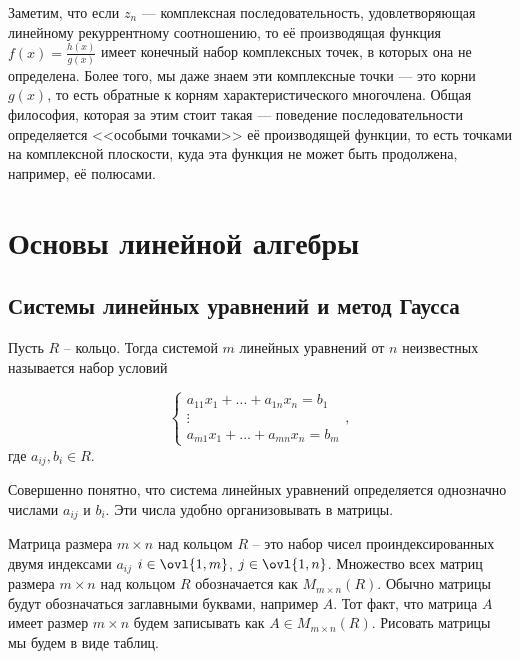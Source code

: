 Заметим, что если $z_n$ --- комплексная последовательность, удовлетворяющая линейному рекуррентному соотношению, то её производящая функция $f(x)=\frac{h(x)}{g(x)}$ имеет конечный набор комплексных точек, в которых она не определена. Более того, мы даже знаем эти комплексные точки --- это корни $g(x)$, то есть обратные к корням характеристического многочлена. Общая философия, которая за этим стоит такая --- поведение последовательности определяется  <<особыми точками>> её производящей функции, то есть точками на комплексной плоскости, куда эта  функция не может быть продолжена, например, её полюсами.




\chapter{Основы линейной алгебры}


\setcounter{zad}{0}
\setcounter{lem}{0}
\setcounter{thm}{0}
\setcounter{cor}{0}




\section{Системы линейных уравнений и метод Гаусса}

\dfn Пусть $R$ -- кольцо. Тогда системой $m$ линейных уравнений от $n$ неизвестных называется набор условий

$$\begin{cases}
a_{11}x_1+\dots + a_{1n}x_n=b_1\\
\vdots \\
a_{m1}x_1+\dots+a_{mn}x_n=b_m
\end{cases},$$
где $a_{ij}, b_i \in R$.
\edfn

Совершенно понятно, что система линейных уравнений определяется однозначно числами $a_{ij}$ и $b_i$. Эти числа удобно организовывать в матрицы.

\dfn Матрица размера $m\times n$ над кольцом $R$ -- это набор чисел проиндексированных двумя индексами $a_{ij}$ $i\in \ovl{1,m}$, $j\in \ovl{1,n}$. Множество всех матриц размера $m\times n$ над кольцом $R$ обозначается как $M_{m\times n}(R)$. Обычно матрицы  будут обозначаться заглавными буквами, например $A$. Тот факт, что матрица $A$ имеет размер $m\times n$ будем записывать как $A\in M_{m\times n}(R)$. Рисовать матрицы мы будем в виде таблиц.
\edfn

